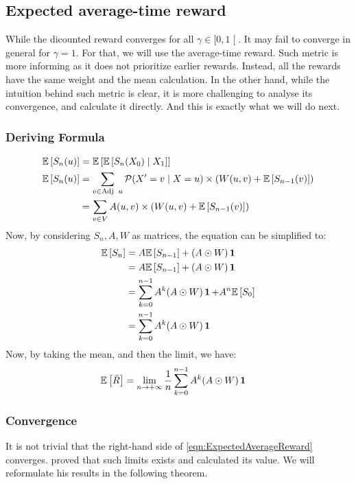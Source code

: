 \subsection{Expected average-time reward}
\label{section:ProbabilisticStrategies:AverageTimeReward}
While the dicounted reward converges for all $\gamma\in\mathopen[0,1\mathclose [.$ It may fail to converge in general for $\gamma=1.$ 
\newline For that, we will use the average-time reward. Such metric is more informing as it does not prioritize earlier rewards. Instead, all the rewards have the same weight and the mean calculation.
\newline In the other hand, while the intuition behind such metric is clear, it is more challenging to analyse its convergence, and calculate it directly. And this is exactly what we will do next. 
\subsubsection{Deriving Formula}
\begin{align*}
	\mathbb{E}\left[S_n(u)\right]&= \mathbb{E}\left[\mathbb{E}\left[S_n(X_0) \mid X_1\right]\right] \\
	\mathbb{E}\left[S_n(u)\right] & =\sum_{v\in \operatorname{Adj} \ u} \mathcal{P}(X'=v\mid X=u)\times (W(u,v)+ \mathbb{E}\left[S_{n-1}(v)\right]) \\
	&=\sum_{v\in V}  A(u,v) \times (W(u,v)+\mathbb{E}\left[S_{n-1}(v)\right])
\end{align*}
Now, by considering $S_n,A,W$ as matrices, the equation can be simplified to:
\begin{align*}
	\mathbb{E}\left[S_n\right] 
	&=A\mathbb{E}\left[S_{n-1}\right]+(A\odot W)\operatorname{\mathbf{1}}\\
	&=A\mathbb{E}\left[S_{n-1}\right]+(A\odot W)\operatorname{\mathbf{1}}\\
	&= \sum_{k=0}^{n-1}A^k(A\odot W)\operatorname{\mathbf{1}}+A^n\mathbb{E}\left[S_0\right] \\
	&=\sum_{k=0}^{n-1}A^k(A\odot W)\operatorname{\mathbf{1}}\\
\end{align*}
Now, by taking the mean, and then the limit, we have:
\begin{align}
	\label{eqn:ExpectedAverageReward}
	\mathbb{E}\left[\bar{R}\right]&=\lim_{n\rightarrow +\infty}\frac{1}{n}\sum_{k=0}^{n-1}A^k(A\odot W)\operatorname{\mathbf{1}}
\end{align}
\subsubsection{Convergence}
It is not trivial that the right-hand side of \eqref{eqn:ExpectedAverageReward} converges.
\newline \citeauthor{AverageTimeRewardStochastic}\cite{AverageTimeRewardStochastic} proved that such limits exists and calculated its value. We will reformulate his results in the following theorem.

